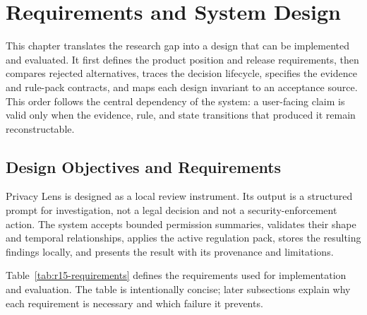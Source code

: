 \section{Requirements and System Design}

This chapter translates the research gap into a design that can be implemented and evaluated. It first defines the product position and release requirements, then compares rejected alternatives, traces the decision lifecycle, specifies the evidence and rule-pack contracts, and maps each design invariant to an acceptance source. This order follows the central dependency of the system: a user-facing claim is valid only when the evidence, rule, and state transitions that produced it remain reconstructable.

\subsection{Design Objectives and Requirements}

Privacy Lens is designed as a local review instrument. Its output is a structured prompt for investigation, not a legal decision and not a security-enforcement action. The system accepts bounded permission summaries, validates their shape and temporal relationships, applies the active regulation pack, stores the resulting findings locally, and presents the result with its provenance and limitations.

Table~\ref{tab:r15-requirements} defines the requirements used for implementation and evaluation. The table is intentionally concise; later subsections explain why each requirement is necessary and which failure it prevents.

